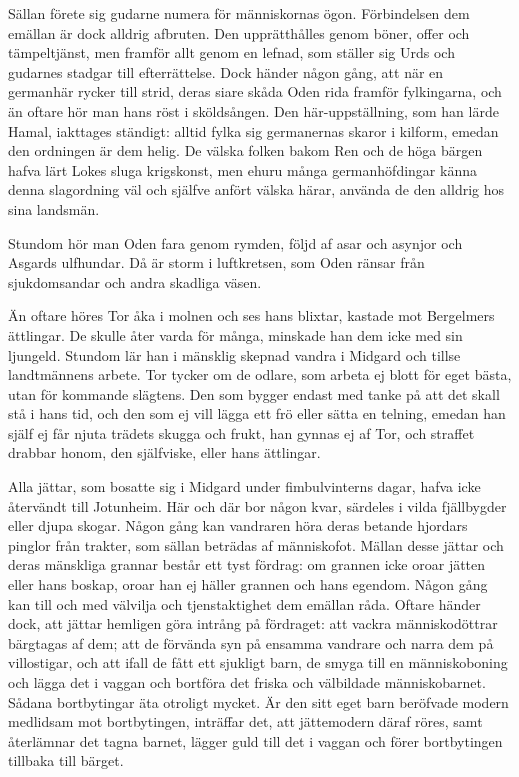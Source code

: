 Sällan förete sig gudarne numera för människornas ögon. Förbindelsen dem
emällan är dock alldrig afbruten. Den
upprätthålles genom böner, offer och tämpeltjänst, men framför allt
genom en lefnad, som ställer sig Urds och gudarnes stadgar till
efterrättelse. Dock händer någon gång, att när en germanhär rycker till
strid, deras siare skåda Oden rida framför fylkingarna, och än oftare
hör man hans röst i sköldsången. Den här-uppställning, som han lärde
Hamal, iakttages ständigt: alltid fylka sig germanernas skaror i
kilform, emedan den ordningen är dem helig. De välska folken bakom Ren
och de höga bärgen hafva lärt Lokes sluga krigskonst, men ehuru många
germanhöfdingar känna denna slagordning väl och själfve anfört välska
härar, använda de den alldrig hos sina landsmän.

Stundom hör man Oden fara genom rymden, följd af asar och asynjor och
Asgards ulfhundar. Då är storm i luftkretsen, som Oden ränsar från
sjukdomsandar och andra skadliga väsen.

Än oftare höres Tor åka i molnen och ses hans blixtar, kastade mot
Bergelmers ättlingar. De skulle åter varda för många, minskade han dem
icke med sin ljungeld. Stundom lär han i mänsklig skepnad vandra i
Midgard och tillse landtmännens arbete. Tor tycker om de odlare, som
arbeta ej blott för eget bästa, utan för kommande slägtens. Den som
bygger endast med tanke på att det skall stå i hans tid, och den som ej
vill lägga ett frö eller sätta en telning, emedan han själf ej får njuta
trädets skugga och frukt, han gynnas ej af Tor, och straffet drabbar
honom, den själfviske, eller hans ättlingar.

Alla jättar, som bosatte sig i Midgard under fimbulvinterns dagar, hafva
icke återvändt till Jotunheim. Här och där bor någon kvar, särdeles i
vilda fjällbygder eller djupa skogar. Någon gång kan vandraren höra
deras betande hjordars pinglor från trakter, som sällan beträdas af
människofot. Mällan desse jättar och deras mänskliga grannar består ett
tyst fördrag: om grannen icke oroar jätten eller hans boskap, oroar han
ej häller grannen och hans egendom. Någon gång kan till och med välvilja
och tjenstaktighet dem emällan råda. Oftare
händer dock, att jättar hemligen göra intrång på fördraget: att vackra
människodöttrar bärgtagas af dem; att de förvända syn på ensamma
vandrare och narra dem på villostigar, och att ifall de fått ett
sjukligt barn, de smyga till en människoboning och lägga det i vaggan
och bortföra det friska och välbildade människobarnet. Sådana
bortbytingar äta otroligt mycket. Är den sitt eget barn beröfvade modern
medlidsam mot bortbytingen, inträffar det, att jättemodern däraf röres,
samt återlämnar det tagna barnet, lägger guld till det i vaggan och
förer bortbytingen tillbaka till bärget.

